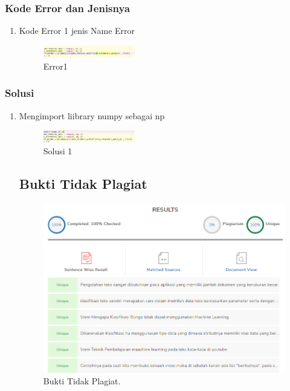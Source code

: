         \subsubsection{Kode Error dan Jenisnya}
        \begin{enumerate}
            \item Kode Error 1 jenis Name Error
            \begin{figure}[H]
                \includegraphics[width=4cm]{figures/1174008/4/err1.png}
                \centering
                \caption{Error1}
            \end{figure}
        \end{enumerate}

        \subsubsection{Solusi}
        \begin{enumerate}
            \item Mengimport liibrary numpy sebagai np
            \begin{figure}[H]
                \includegraphics[width=4cm]{figures/1174008/4/solution1.png}
                \centering
                \caption{Solusi 1}
            \end{figure}

	\subsection{Bukti Tidak Plagiat}
	\begin{figure}[H]
		\includegraphics[width=8 cm]{figures/1174008/4/buktiplagiat.png}	
		\centering
		\caption{Bukti Tidak Plagiat.}
	\end{figure}
        \end{enumerate}